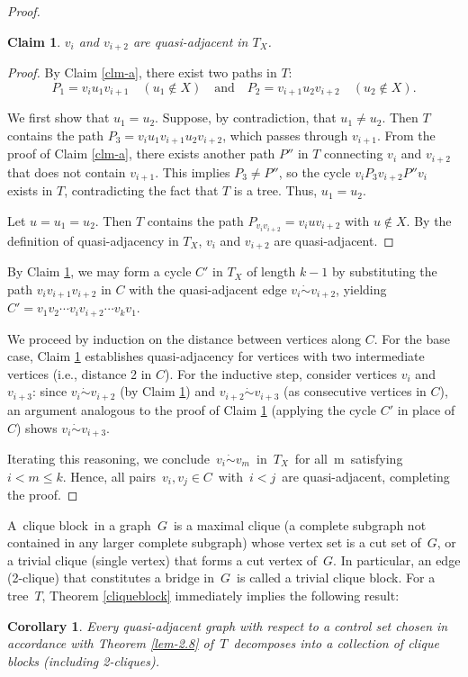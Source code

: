\documentclass[12pt]{amsart}
\newtheorem{cor}{Corollary}[section]
\newtheorem{claim}{Claim}[section]
\begin{document}
\begin{proof}
	
	\begin{claim}\label{clm-b}
		$v_i$ and $v_{i+2}$ are quasi-adjacent in $T_X$.
	\end{claim}
	
	\begin{proof}
		By Claim \ref{clm-a}, there exist two paths in $T$:
		\[ P_1 = v_i u_1 v_{i+1} \quad (u_1 \notin X) \quad \text{and} \quad P_2 = v_{i+1} u_2 v_{i+2} \quad (u_2 \notin X). \]
		
		We first show that $u_1 = u_2$. Suppose, by contradiction, that $u_1 \neq u_2$. Then $T$ contains the path
		$ P_3 = v_i u_1 v_{i+1} u_2 v_{i+2}$, 
		which passes through $v_{i+1}$. From the proof of Claim \ref{clm-a}, there exists another path $P''$ in $T$ connecting $v_i$ and $v_{i+2}$ that does not contain $v_{i+1}$. This implies $P_3 \neq P''$, so the cycle
		$v_i P_3 v_{i+2} P'' v_i$ exists in $T$, contradicting the fact that $T$ is a tree. Thus, $u_1 = u_2$.
		
		Let $u = u_1 = u_2$. Then $T$ contains the path
		$ P_{v_iv_{i+2}} = v_i u v_{i+2} $
		with $u \notin X$. By the definition of quasi-adjacency in $T_X$, $v_i$ and $v_{i+2}$ are quasi-adjacent.
	\end{proof}
	
	By Claim \ref{clm-b}, we may form a cycle \( C' \) in \( T_X \) of length \( k-1 \) by substituting the path \( v_i v_{i+1} v_{i+2} \) in \( C \) with the quasi-adjacent edge \( v_i \dot{\sim} v_{i+2} \), yielding \( C' = v_1 v_2 \cdots v_i v_{i+2} \cdots v_k v_1 \).
	
	We proceed by induction on the distance between vertices along \( C \). For the base case, Claim \ref{clm-b} establishes quasi-adjacency for vertices with two intermediate vertices (i.e., distance 2 in \( C \)). For the inductive step, consider vertices \( v_i \) and \( v_{i+3} \): since \( v_i \dot{\sim} v_{i+2} \) (by Claim \ref{clm-b}) and \( v_{i+2} \dot{\sim} v_{i+3} \) (as consecutive vertices in \( C \)), an argument analogous to the proof of Claim \ref{clm-b} (applying the cycle \( C' \) in place of \( C \)) shows \( v_i \dot{\sim} v_{i+3} \).
	
Iterating this reasoning, we conclude \(v_i \dot{\sim} v_m\) in \(T_X\) for all m satisfying \(i < m \leq k\). Hence, all pairs \(v_i, v_j \in C\) with \(i < j\) are quasi-adjacent, completing the proof.
\end{proof}

A clique block in a graph $G$ is a maximal clique (a complete subgraph not contained in any larger complete subgraph) whose vertex set is a cut set of $G$, or a trivial clique (single vertex) that forms a cut vertex of $G$. In particular, an edge (2-clique) that constitutes a bridge in $G$ is called a trivial clique block. For a tree $T$, Theorem \ref{cliqueblock} immediately implies the following result:
\begin{cor}\label{cor-2.1}
Every quasi-adjacent graph with respect to a control set chosen in accordance with Theorem \ref{lem-2.8} of $T$ decomposes into a collection of clique blocks (including 2-cliques).
\end{cor}
\end{document}
